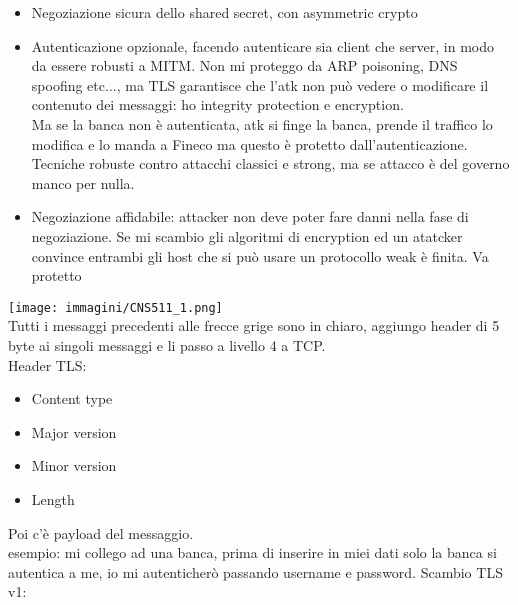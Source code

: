 \documentclass[16px]{article}
\begin{document}
\begin{itemize}
\item Negoziazione sicura dello shared secret, con asymmetric crypto
\item Autenticazione opzionale, facendo autenticare sia client che server, in modo da essere robusti a MITM. Non mi proteggo da ARP poisoning, DNS spoofing etc..., ma TLS garantisce che l'atk non può vedere o modificare il contenuto dei messaggi: ho integrity protection e encryption.\\ Ma se la banca non è autenticata, atk si finge la banca, prende il traffico lo modifica e lo manda a Fineco ma questo è protetto dall'autenticazione.\\ Tecniche robuste contro attacchi classici e strong, ma se attacco è del governo manco per nulla.
\item Negoziazione affidabile: attacker non deve poter fare danni nella fase di negoziazione. Se mi scambio gli algoritmi di encryption ed un atatcker convince entrambi gli host che si può usare un protocollo weak è finita. Va protetto
\end{itemize}
\texttt{[image: immagini/CNS511\_1.png]}\\
Tutti i messaggi precedenti alle frecce grige sono in chiaro, aggiungo header di 5 byte ai singoli messaggi e li passo a livello 4 a TCP.\\ Header TLS:
\begin{itemize}
\item Content type
\item Major version
\item Minor version
\item Length
\end{itemize}
Poi c'è payload del messaggio.\\ esempio: mi collego ad una banca, prima di inserire in miei dati solo la banca si autentica a me, io mi autenticherò passando username e password. Scambio TLS v1:
\end{document}
